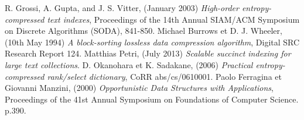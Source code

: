 \begin{thebibliography}{ABC}	
	 R. Grossi, A. Gupta, and J. S. Vitter, (January 2003) \emph{High-order entropy-compressed text indexes}, Proceedings of the 14th Annual SIAM/ACM Symposium on Discrete Algorithms (SODA), 841-850.
     Michael Burrows et D. J. Wheeler, (10th May 1994) \emph{A block-sorting lossless data compression algorithm}, Digital SRC Research Report 124.
     Matthias Petri, (July 2013) \emph{Scalable succinct indexing for large text collections}.
     D. Okanohara et K. Sadakane, (2006) \emph{Practical entropy-compressed rank/select dictionary}, CoRR abs/cs/0610001.
     Paolo Ferragina et Giovanni Manzini, (2000) \emph{Opportunistic Data Structures with Applications}, Proceedings of the 41st Annual Symposium on Foundations of Computer Science. p.390.


\end{thebibliography}

